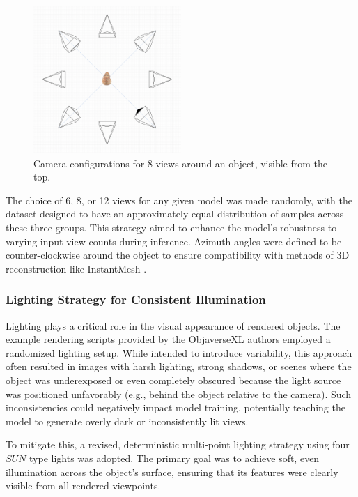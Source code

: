 \begin{figure}[h]
  \centering
  \includegraphics[width=0.5\textwidth, angle=180]{images/data/rendering-up.png}
  \caption{Camera configurations for 8 views around an object, visible from the top.}
  \label{fig:camera-setups-up}
\end{figure}

The choice of 6, 8, or 12 views for any given model was made randomly, with the dataset designed to have an approximately equal distribution of samples across these three groups. This strategy aimed to enhance the model's robustness to varying input view counts during inference. Azimuth angles were defined to be counter-clockwise around the object to ensure compatibility with methods of 3D reconstruction like InstantMesh \cite{instantmesh}.

\subsubsection{Lighting Strategy for Consistent Illumination}\label{sssec:lighting-strategy}
Lighting plays a critical role in the visual appearance of rendered objects. The example rendering scripts provided by the ObjaverseXL authors \cite{objaverse} employed a randomized lighting setup. While intended to introduce variability, this approach often resulted in images with harsh lighting, strong shadows, or scenes where the object was underexposed or even completely obscured because the light source was positioned unfavorably (e.g., behind the object relative to the camera). Such inconsistencies could negatively impact model training, potentially teaching the model to generate overly dark or inconsistently lit views.

To mitigate this, a revised, deterministic multi-point lighting strategy using four $SUN$ type lights was adopted. The primary goal was to achieve soft, even illumination across the object's surface, ensuring that its features were clearly visible from all rendered viewpoints.

